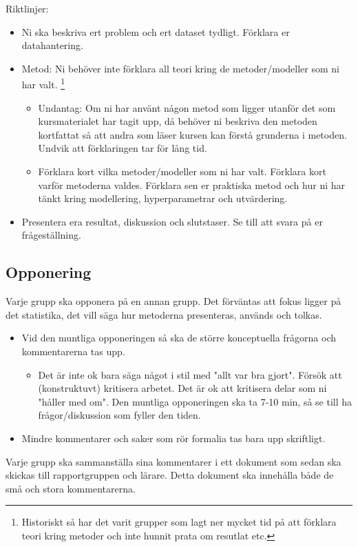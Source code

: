 \documentclass[a4paper]{article}
\begin{document}
Riktlinjer:
\begin{itemize}
    \item Ni ska beskriva ert problem och ert dataset tydligt. Förklara er datahantering.
    \item Metod: Ni behöver inte förklara all teori kring de metoder/modeller som ni har valt.
    \footnote{Historiskt så har det varit grupper som lagt ner mycket tid på att förklara teori kring metoder och inte hunnit prata om resutlat etc.}
    \begin{itemize}
        \item Undantag: Om ni har använt någon metod som ligger utanför det som 
        kursmaterialet har tagit upp, då behöver ni beskriva den metoden kortfattat så
        att andra som läser kursen kan förstå grunderna i metoden. Undvik att förklaringen tar för lång tid.
        \item Förklara kort vilka metoder/modeller som ni har valt. Förklara kort varför metoderna valdes. Förklara sen er
        praktiska metod och hur ni har tänkt kring modellering, hyperparametrar och utvärdering.
        \end{itemize}
    \item Presentera era resultat, diskussion och slutstaser. Se till att svara på er frågeställning.
\end{itemize}



\subsection*{Opponering}
Varje grupp ska opponera på en annan grupp. Det förväntas att fokus ligger på det statistika, det vill säga hur metoderna presenteras, används och tolkas.
\begin{itemize}
    \item Vid den muntliga opponeringen så ska de större konceptuella frågorna och kommentarerna tas upp.
    \begin{itemize}
      \item Det är inte ok bara säga något i stil med "allt var bra gjort". 
      Försök att (konstruktuvt) kritisera arbetet. Det är ok att kritisera delar som ni "håller med om". 
      Den muntliga opponeringen ska ta 7-10 min, så se till ha frågor/diskussion som fyller den tiden. 
    \end{itemize}
    \item Mindre kommentarer och saker som rör formalia tas bara upp skriftligt.
\end{itemize}
Varje grupp ska sammanställa sina kommentarer i ett dokument som sedan ska skickas till rapportgruppen och lärare. Detta dokument ska innehålla både de små och stora kommentarerna.
\end{document}
